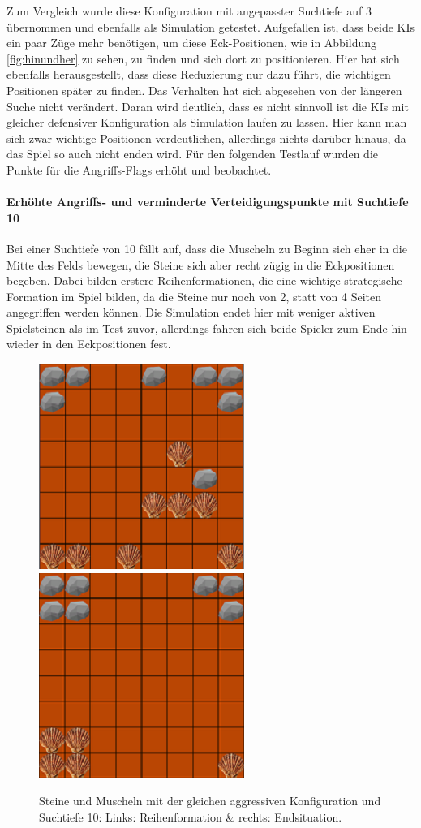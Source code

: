 Zum Vergleich wurde diese Konfiguration mit angepasster Suchtiefe auf 3 übernommen und ebenfalls als Simulation getestet. Aufgefallen ist, dass beide KIs ein paar Züge mehr benötigen, um diese Eck-Positionen, wie in Abbildung \ref{fig:hinundher} zu sehen, zu finden und sich dort zu positionieren. Hier hat sich ebenfalls herausgestellt, dass diese Reduzierung nur dazu führt, die wichtigen Positionen später zu finden. Das Verhalten hat sich abgesehen von der längeren Suche nicht verändert.
Daran wird deutlich, dass es nicht sinnvoll ist die KIs mit gleicher defensiver Konfiguration als Simulation laufen zu lassen. Hier kann man sich zwar wichtige Positionen verdeutlichen, allerdings nichts darüber hinaus, da das Spiel so auch nicht enden wird. Für den folgenden Testlauf wurden die Punkte für die Angriffs-Flags erhöht und beobachtet.
\paragraph{Erhöhte Angriffs- und verminderte Verteidigungspunkte mit Suchtiefe 10}
Bei einer Suchtiefe von 10 fällt auf, dass die Muscheln zu Beginn sich eher in die Mitte des Felds bewegen, die Steine sich aber recht zügig in die Eckpositionen begeben. Dabei bilden erstere Reihenformationen, die eine wichtige strategische Formation im Spiel bilden, da die Steine nur noch von 2, statt von 4 Seiten angegriffen werden können. Die Simulation endet hier mit weniger aktiven Spielsteinen als im Test zuvor, allerdings fahren sich beide Spieler zum Ende hin wieder in den Eckpositionen fest.
\begin{figure}[h]
	\centering
	\includegraphics{img/reihe22}
	\includegraphics{img/Aggro/aggroEnde22}
	\caption{Steine und Muscheln mit der gleichen aggressiven Konfiguration und Suchtiefe 10: Links: Reihenformation \& rechts: Endsituation.}
	\label{fig:aggro}
\end{figure}
